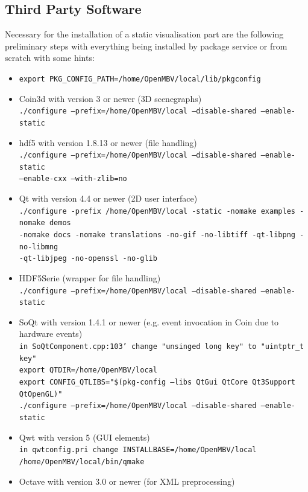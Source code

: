 \subsection{Third Party Software}\label{sec:third_party}
Necessary for the installation of a static visualisation part are the following preliminary steps with everything being installed by package service or from scratch with some hints:
\begin{itemize}
\item \texttt{export PKG\_CONFIG\_PATH=/home/OpenMBV/local/lib/pkgconfig}
\item Coin3d with version 3 or newer (3D scenegraphs)\\
    \texttt{./configure --prefix=/home/OpenMBV/local --disable-shared --enable-static}
\item hdf5 with version 1.8.13 or newer (file handling)\\
    \texttt{./configure --prefix=/home/OpenMBV/local --disable-shared --enable-static\\ --enable-cxx --with-zlib=no}
\item Qt with version 4.4 or newer (2D user interface)\\
    \texttt{./configure -prefix /home/OpenMBV/local -static -nomake examples -nomake demos\\ -nomake docs -nomake translations -no-gif -no-libtiff -qt-libpng -no-libmng\\ -qt-libjpeg -no-openssl -no-glib}
\item HDF5Serie (wrapper for file handling)\\
    \texttt{./configure --prefix=/home/OpenMBV/local --disable-shared --enable-static}
\item SoQt with version 1.4.1 or newer (e.g. event invocation in Coin due to hardware events)\\
    \texttt{in SoQtComponent.cpp:103' change "unsinged long key" to "uintptr\_t key"}\\
    \texttt{export QTDIR=/home/OpenMBV/local}\\
    \texttt{export CONFIG\_QTLIBS="\$(pkg-config --libs QtGui QtCore Qt3Support QtOpenGL)"}\\
    \texttt{./configure --prefix=/home/OpenMBV/local --disable-shared --enable-static}
\item Qwt with version 5 (GUI elements)\\
    \texttt{in qwtconfig.pri change INSTALLBASE=/home/OpenMBV/local}\\
    \texttt{/home/OpenMBV/local/bin/qmake}
\item Octave with version 3.0 or newer (for XML preprocessing) 
\end{itemize}

